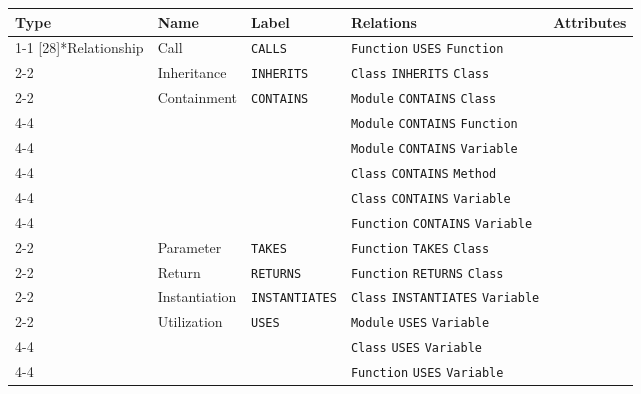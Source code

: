 \begin{tabularx}{\textwidth}{p{1.8cm}lllX}
\toprule
\textbf{Type} & \textbf{Name} & \textbf{Label} & \textbf{Relations} & \textbf{Attributes} \\
\cmidrule{1-1}\cmidrule{2-2}\cmidrule{3-3}\cmidrule{4-4}\cmidrule{5-5}
\multirow{14}[{28}]{*}{Relationship} & Call & \texttt{CALLS} & \texttt{Function} \texttt{USES} \texttt{Function} &  \\
\cmidrule{2-2}\cmidrule{3-3}\cmidrule{4-4}\cmidrule{5-5}
 & Inheritance & \texttt{INHERITS} & \texttt{Class} \texttt{INHERITS} \texttt{Class} &  \\
\cmidrule{2-2}\cmidrule{3-3}\cmidrule{4-4}\cmidrule{5-5}
 & \multirow{6}[{12}]{*}{Containment} & \multirow{6}[{12}]{*}{\texttt{CONTAINS}} & \texttt{Module} \texttt{CONTAINS} \texttt{Class} &  \\
\cmidrule{4-4}\cmidrule{5-5}
 &  &  & \texttt{Module} \texttt{CONTAINS} \texttt{Function} &  \\
\cmidrule{4-4}\cmidrule{5-5}
 &  &  & \texttt{Module} \texttt{CONTAINS} \texttt{Variable} &  \\
\cmidrule{4-4}\cmidrule{5-5}
 &  &  & \texttt{Class} \texttt{CONTAINS} \texttt{Method} &  \\
\cmidrule{4-4}\cmidrule{5-5}
 &  &  & \texttt{Class} \texttt{CONTAINS} \texttt{Variable} &  \\
\cmidrule{4-4}\cmidrule{5-5}
 &  &  & \texttt{Function} \texttt{CONTAINS} \texttt{Variable} &  \\
\cmidrule{2-2}\cmidrule{3-3}\cmidrule{4-4}\cmidrule{5-5}
 & Parameter & \texttt{TAKES} & \texttt{Function} \texttt{TAKES} \texttt{Class} &  \\
\cmidrule{2-2}\cmidrule{3-3}\cmidrule{4-4}\cmidrule{5-5}
 & Return & \texttt{RETURNS} & \texttt{Function} \texttt{RETURNS} \texttt{Class} &  \\
\cmidrule{2-2}\cmidrule{3-3}\cmidrule{4-4}\cmidrule{5-5}
 & Instantiation & \texttt{INSTANTIATES} & \texttt{Class} \texttt{INSTANTIATES} \texttt{Variable} &  \\
\cmidrule{2-2}\cmidrule{3-3}\cmidrule{4-4}\cmidrule{5-5}
 & \multirow{3}[{6}]{*}{Utilization} & \multirow{3}[{6}]{*}{\texttt{USES}} & \texttt{Module} \texttt{USES} \texttt{Variable} &  \\
\cmidrule{4-4}\cmidrule{5-5}
 &  &  & \texttt{Class} \texttt{USES} \texttt{Variable} &  \\
\cmidrule{4-4}\cmidrule{5-5}
 &  &  & \texttt{Function} \texttt{USES} \texttt{Variable} &  \\
\bottomrule
\end{tabularx}

